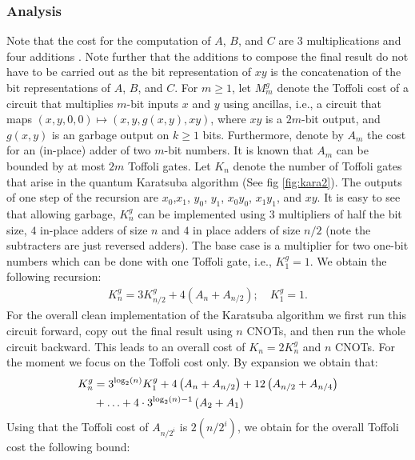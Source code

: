     \subsubsection{Analysis}
      Note that the cost for the computation of $A$, $B$, and $C$ are $3$ multiplications and four additions . 
      Note further that the additions to compose the final result do not have to be carried out as the bit representation of $xy$ is the concatenation of the bit representations of $A$, $B$, and $C$. 
      For $m\geq 1$, let $M^{g}_m$ denote the Toffoli cost of a circuit that multiplies $m$-bit inputs $x$ and $y$ using ancillas, i.e., a circuit that maps $(x, y, 0, 0) \mapsto (x, y, g(x,y), xy)$, where $xy$ is a $2m$-bit output, and $g(x,y)$ is an garbage output on $k\geq 1$ bits. 
      Furthermore, denote by $A_m$ the cost for an (in-place) adder of two $m$-bit numbers. 
      It is known that $A_m$ can be bounded by at most $2m$ Toffoli gates. Let $K_n$ denote the number of Toffoli gates that arise in the quantum Karatsuba algorithm (See fig \cref{fig:kara2}).
      The outputs of one step of the recursion are $x_0$,$x_1$, $y_0$, $y_1$, $x_0y_0$, $x_1 y_1$, and $xy$. 
      It is easy to see that allowing garbage, $K_n^g$ can be implemented using $3$ multipliers of half the bit size, $4$ in-place adders of size $n$ and $4$ in place adders of size $n/2$ (note the subtracters are just reversed adders). 
      The base case is a multiplier for two one-bit numbers which can be done with one Toffoli gate, i.e., $K_1^{g}=1$. 
      We obtain the following recursion: 
      \begin{align}
        K_n^{g} = 3 K_{n/2}^{g} + 4 \left(A_{n} + A_{n/2}\right); \quad K_1^{g}=1.
      \end{align}
      For the overall clean implementation of the Karatsuba algorithm we first run this circuit forward, copy out the final result using $n$ CNOTs, and then run the whole circuit backward. 
      This leads to an overall cost of $K_n = 2 K_n^{g}$ and $n$ CNOTs. 
      For the moment we focus on the Toffoli cost only. 
      By expansion we obtain that:
      \begin{align}
        K_n^{g} &= 3^{\log_2(n)} K_1^{g} + 4\left( A_{n}+ A_{n/2} \right) + 12\left( A_{n/2}+ A_{n/4} \right)\notag\\ 
                & + \ldots + 4 \cdot 3^{\log_2(n)-1} \left(A_2 + A_1\right)
      \end{align}
      Using that the Toffoli cost of $A_{n/2^i}$ is $2(n/2^i)$, we obtain for the overall Toffoli cost the following bound: 
